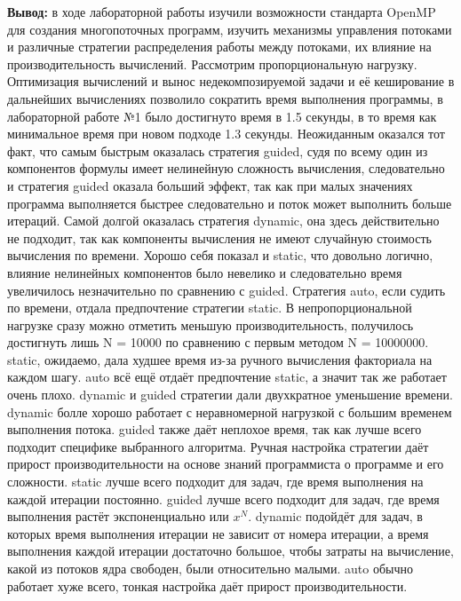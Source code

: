 \documentclass[a4paper,14pt]{extarticle}
\begin{document}
\textbf{Вывод: } в ходе лабораторной работы изучили возможности стандарта OpenMP для создания многопоточных
программ, изучить механизмы управления потоками и различные стратегии распределения
работы между потоками, их влияние на производительность вычислений. Рассмотрим пропорциональную нагрузку.
Оптимизация вычислений и вынос
недекомпозируемой задачи и её кеширование в дальнейших вычислениях позволило сократить время выполнения программы, 
в лабораторной работе №1 было достигнуто время в 1.5 секунды, в то время как минимальное время при новом подходе
1.3 секунды. Неожиданным оказался тот факт, что самым быстрым оказалась стратегия guided, судя по всему один из компонентов
формулы имеет нелинейную сложность вычисления, следовательно и стратегия guided оказала больший эффект, так как 
при малых значениях программа выполняется быстрее следовательно и поток может выполнить больше итераций. 
Самой долгой оказалась стратегия dynamic, она здесь действительно не подходит, так как компоненты вычисления
не имеют случайную стоимость вычисления по времени. Хорошо себя показал и static, что довольно логично, 
влияние нелинейных компонентов было невелико и следовательно время увеличилось незначительно по сравнению с 
guided. Стратегия auto, если судить по времени, отдала предпочтение стратегии static. 
В непропорциональной нагрузке сразу можно отметить меньшую производительность, получилось достигнуть лишь N = 10000
по сравнению с первым методом N = 10000000. static, ожидаемо, дала худшее время из-за ручного вычисления
факториала на каждом шагу. auto всё ещё отдаёт предпочтение static, а значит так же работает
очень плохо. dynamic и guided стратегии дали двухкратное уменьшение времени. dynamic болле хорошо 
работает с неравномерной нагрузкой с большим временем выполнения потока. guided также даёт неплохое время, 
так как лучше всего подходит специфике выбранного алгоритма.
Ручная настройка стратегии даёт прирост производительности на основе знаний программиста о программе и его сложности.
static лучше всего подходит для задач, где время выполнения на каждой итерации постоянно.
guided лучше всего подходит для задач, где время выполнения растёт экспоненциально или $x^N$. 
dynamic подойдёт для задач, в которых время выполнения итерации не зависит от номера итерации, а время выполнения каждой итерации
достаточно большое, чтобы затраты на вычисление, какой из потоков ядра свободен, были относительно малыми.
auto обычно работает хуже всего, тонкая настройка даёт прирост производительности.
\end{document}
